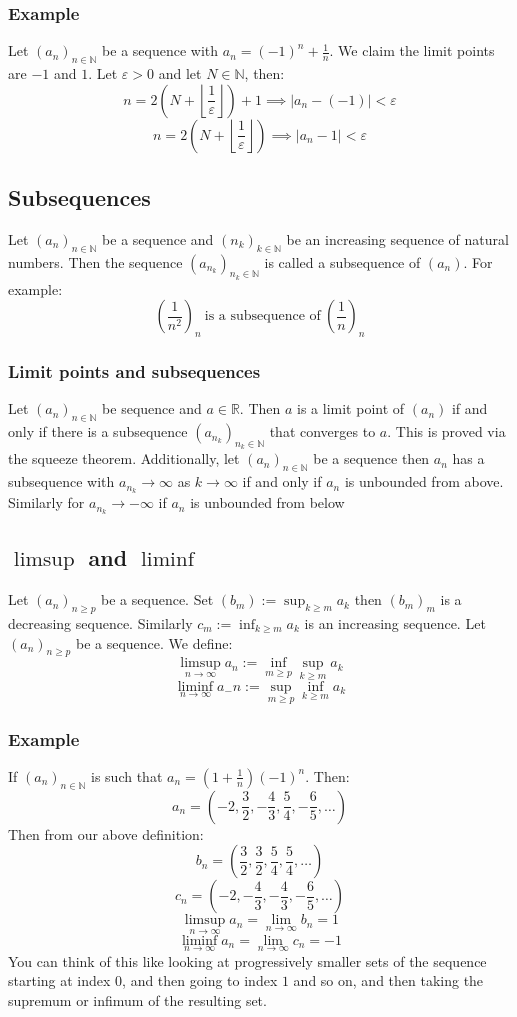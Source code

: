 \documentclass[12pt]{article}
\newcommand{\seq}[2]{(#1_#2)_{#2\in\mathbb{N}}}
\begin{document}
\subsubsection*{Example}
Let \(\seq{a}{n}\) be a sequence with \(a_n=(-1)^n+\frac{1}{n}\). We claim the limit points are \(-1\) and \(1\). Let \(\varepsilon>0\) and let \(N\in\mathbb{N}\), then:
\[n=2\left(N+\left\lfloor\frac{1}{\varepsilon}\right\rfloor\right)+1\implies|a_n-(-1)|<\varepsilon\]
\[n=2\left(N+\left\lfloor\frac{1}{\varepsilon}\right\rfloor\right)\implies|a_n-1|<\varepsilon\]
\subsection{Subsequences}
Let \(\seq{a}{n}\) be a sequence and \(\seq{n}{k}\) be an increasing sequence of natural numbers. Then the sequence \(\seq{a}{{n_k}}\) is called a subsequence of \((a_n)\). For example:
\[\left(\frac{1}{n^2}\right)_n\ \text{is a subsequence of}\ \left(\frac{1}{n}\right)_n\]
\subsubsection{Limit points and subsequences}
Let \(\seq{a}{n}\) be sequence and \(a\in \mathbb{R}\). Then \(a\) is a limit point of \((a_n)\) if and only if there is a subsequence \(\seq{a}{{n_k}}\) that converges to \(a\). This is proved via the squeeze theorem. Additionally, let \(\seq{a}{n}\) be a sequence then \(a_n\) has a subsequence with \(a_{n_k}\to\infty\) as \(k\to\infty\) if and only if \(a_n\) is unbounded from above. Similarly for \(a_{n_k}\to-\infty\) if \(a_n\) is unbounded from below
\subsection{\(\limsup\) and \(\liminf\)}
Let \((a_n)_{n\geq p}\) be a sequence. Set \((b_m):=\sup_{k\geq m}a_k\) then \((b_m)_m\) is a decreasing sequence. Similarly \(c_m:=\inf_{k\geq m}a_k\) is an increasing sequence. Let \((a_n)_{n\geq p}\) be a sequence. We define:
\[\limsup_{n\to\infty}a_n:=\inf_{m\geq p}\sup_{k\geq m}a_k\]
\[\liminf_{n\to\infty}a_-n:=\sup_{m\geq p}\inf_{k\geq m}a_k\]
\subsubsection*{Example}
If \(\seq{a}{n}\) is such that \(a_n=(1+\frac{1}{n})(-1)^n\). Then:
\[a_n=\left(-2,\frac{3}{2},-\frac{4}{3},\frac{5}{4},-\frac{6}{5},\dots\right)\]
Then from our above definition:
\[b_n=\left(\frac{3}{2},\frac{3}{2},\frac{5}{4},\frac{5}{4},\dots\right)\]
\[c_n=\left(-2,-\frac{4}{3},-\frac{4}{3},-\frac{6}{5},\dots\right)\]
\[\limsup_{n\to\infty}a_n=\lim_{n\to\infty}b_n=1\]
\[\liminf_{n\to\infty}a_n=\lim_{n\to\infty}c_n=-1\]
You can think of this like looking at progressively smaller sets of the sequence starting at index \(0\), and then going to index \(1\) and so on, and then taking the supremum or infimum of the resulting set.
\end{document}
